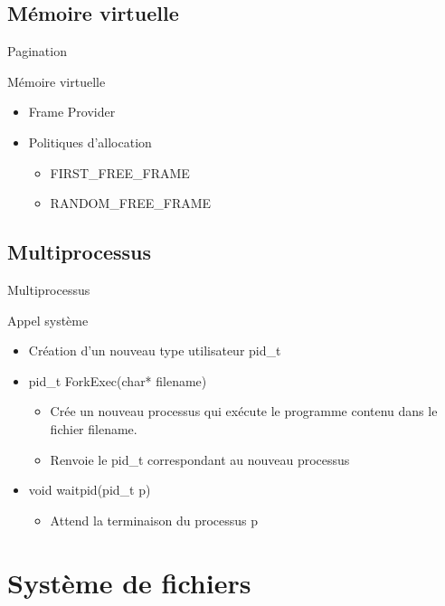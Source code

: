 \documentclass{beamer}
\begin{document}
\subsection{Mémoire virtuelle}
\begin{frame}{Pagination}
	\begin{block}{Mémoire virtuelle}
		\begin{itemize}[<+->]
			\item Frame Provider
			\item Politiques d'allocation
			\begin{itemize}
				\item FIRST\_FREE\_FRAME
				\item RANDOM\_FREE\_FRAME			
			\end{itemize}
		\end{itemize}
	\end{block}
\end{frame}
\subsection{Multiprocessus}

\begin{frame}{Multiprocessus}
	\begin{block}{Appel système}
		\begin{itemize}[<+->]
			\item Création d'un nouveau type utilisateur pid\_t
			\item pid\_t ForkExec(char* filename)
			\begin{itemize}
				\item<1-> Crée un nouveau processus qui exécute le programme contenu dans le fichier filename.
				\item<2-> Renvoie le pid\_t correspondant au nouveau processus
			\end{itemize}
			\item void waitpid(pid\_t p)
			\begin{itemize}
				\item<1-> Attend la terminaison du processus p
			\end{itemize}
		\end{itemize}
	\end{block}
\end{frame}

\section{Système de fichiers}
\end{document}
